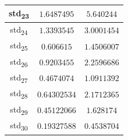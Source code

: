 \documentclass[12pt]{article}
\begin{document}
\begin{table}
\begin{tabular}{||c c c||}
			\hline
			std\textsubscript{23} & $1.6487495$ & $5.640244$ \\
			\hline
			std\textsubscript{24} & $1.3393545$ & $3.0001454$ \\
			\hline
			std\textsubscript{25} & $0.606615$ & $1.4506007$ \\
			\hline
			std\textsubscript{26} & $0.9203455$ & $2.2596686$ \\
			\hline
			std\textsubscript{27} & $0.4674074$ & $1.0911392$ \\
			\hline
			std\textsubscript{28} & $0.64302534$ & $2.1712365$ \\
			\hline
			std\textsubscript{29} & $0.45122066$ & $1.628174$ \\
			\hline
			std\textsubscript{30} & $0.19327588$ & $0.4538704$ \\
			\hline
		\end{tabular}
	\label{Tab:Features_3_2}
\end{table}
\end{document}
